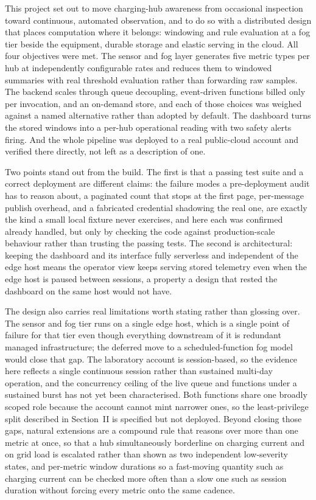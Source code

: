 \documentclass[conference]{IEEEtran}
\begin{document}
This project set out to move charging-hub awareness from occasional inspection toward continuous, automated observation, and to do so with a distributed design that places computation where it belongs: windowing and rule evaluation at a fog tier beside the equipment, durable storage and elastic serving in the cloud. All four objectives were met. The sensor and fog layer generates five metric types per hub at independently configurable rates and reduces them to windowed summaries with real threshold evaluation rather than forwarding raw samples. The backend scales through queue decoupling, event-driven functions billed only per invocation, and an on-demand store, and each of those choices was weighed against a named alternative rather than adopted by default. The dashboard turns the stored windows into a per-hub operational reading with two safety alerts firing. And the whole pipeline was deployed to a real public-cloud account and verified there directly, not left as a description of one.

Two points stand out from the build. The first is that a passing test suite and a correct deployment are different claims: the failure modes a pre-deployment audit has to reason about, a paginated count that stops at the first page, per-message publish overhead, and a fabricated credential shadowing the real one, are exactly the kind a small local fixture never exercises, and here each was confirmed already handled, but only by checking the code against production-scale behaviour rather than trusting the passing tests. The second is architectural: keeping the dashboard and its interface fully serverless and independent of the edge host means the operator view keeps serving stored telemetry even when the edge host is paused between sessions, a property a design that rested the dashboard on the same host would not have.

The design also carries real limitations worth stating rather than glossing over. The sensor and fog tier runs on a single edge host, which is a single point of failure for that tier even though everything downstream of it is redundant managed infrastructure; the deferred move to a scheduled-function fog model would close that gap. The laboratory account is session-based, so the evidence here reflects a single continuous session rather than sustained multi-day operation, and the concurrency ceiling of the live queue and functions under a sustained burst has not yet been characterised. Both functions share one broadly scoped role because the account cannot mint narrower ones, so the least-privilege split described in Section~II is specified but not deployed. Beyond closing those gaps, natural extensions are a compound rule that reasons over more than one metric at once, so that a hub simultaneously borderline on charging current and on grid load is escalated rather than shown as two independent low-severity states, and per-metric window durations so a fast-moving quantity such as charging current can be checked more often than a slow one such as session duration without forcing every metric onto the same cadence.



\end{document}
